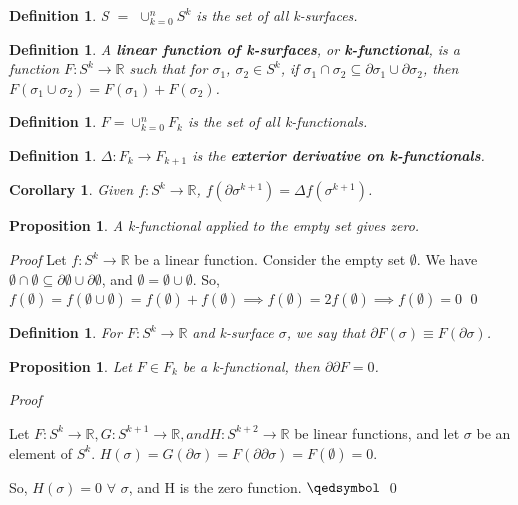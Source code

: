 \documentclass{book}
\newtheorem{defn}[equation]{Definition}
\newtheorem{coro}[equation]{Corollary}
\newtheorem{prop}[equation]{Proposition}
\renewenvironment{proof}{\emph{Proof}}{\qed}
\begin{document}
\begin{defn}
	S $=$ $\cup^n_{k=0}S^k$ is the set of all k-surfaces. 
\end{defn}

\begin{defn}
	A \textbf{linear function of k-surfaces}, or \textbf{k-functional}, is a function $F : S^k \to \mathbb{R}$ such that for $\sigma_1$, $\sigma_2 \in S^k$, if $\sigma_1 \cap \sigma_2 \subseteq \partial\sigma_1 \cup \partial\sigma_2$, then $F(\sigma_1\cup\sigma_2) = F(\sigma_1) + F(\sigma_2)$. 
\end{defn}

\begin{defn}
	$F = \cup_{k=0}^nF_k$ is the set of all k-functionals. 
\end{defn}

\begin{defn}
	$\Delta : F_k \to F_{k+1}$ is the \textbf{exterior derivative on k-functionals}. 
\end{defn}

\begin{coro}
	Given $f : S^k \to \mathbb{R}$, $f(\partial\sigma^{k+1}) = \Delta f(\sigma^{k+1})$. 
\end{coro}

\begin{prop}
	A k-functional applied to the empty set gives zero. 
\end{prop}
\begin{proof}
	Let $f : S^k \to \mathbb{R}$ be a linear function. Consider the empty set $\emptyset$. 
We have $\emptyset \cap \emptyset \subseteq \partial\emptyset \cup \partial\emptyset$, and $\emptyset = \emptyset\cup\emptyset$. 
So, $f(\emptyset) = f(\emptyset\cup\emptyset) = f(\emptyset) + f(\emptyset) \implies f(\emptyset) = 2f(\emptyset) \implies f(\emptyset) = 0$
\end{proof}


\begin{defn}
	For $F : S^k \to \mathbb{R}$ and k-surface $\sigma$, we say that $\partial F(\sigma) \equiv F(\partial\sigma)$. 
\end{defn}


\begin{prop}
	Let $F \in F_k$ be a k-functional, then $\partial\partial F = 0 $.
\end{prop}
\begin{proof}

	Let $F : S^k \to \mathbb{R}, G : S^{k+1} \to \mathbb{R}, and H : S^{k+2} \to \mathbb{R}$ be linear functions, and let $\sigma$ be an element of $S^k$. $H(\sigma) = G(\partial\sigma) = F(\partial\partial\sigma) = F(\emptyset) = 0$. 
	
	So, $H(\sigma) = 0$ $\forall$ $\sigma$, and H is the zero function. 
	$\qedsymbol$
\end{proof}
\end{document}
